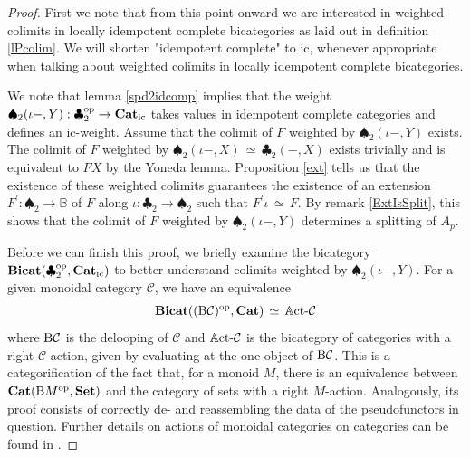 \documentclass[12pt,oneside,reqno,a4paper]{article}
\theoremstyle{definition}
\newcommand{\op}{^\textup{op}}
\newcommand{\Set}{\textbf{\textup{Set}}}
\newcommand{\Cat}{\textbf{\textup{Cat}}}
\newcommand{\Catic}{\textbf{\textup{Cat}}_\textup{ic}}
\newcommand{\Bicat}{\textbf{\textup{Bicat}}}
\newcommand{\rAct}[1]{\mathbb{A}\textup{ct-}#1}
\newcommand{\clb}{\clubsuit}
\newcommand{\spd}{\spadesuit}
\renewcommand{\equiv}{\,\simeq\,}
\newcommand{\B}{\textup{B}}
\newcommand{\C}{\mathcal{C}}
\newcommand{\bB}{\mathbb{B}}
\newcommand{\p}{^\prime}
\begin{document}
\begin{proof}
First we note that from this point onward we are interested in weighted colimits in locally idempotent complete bicategories as laid out in definition \ref{lPcolim}. We will shorten "idempotent complete" to ic, whenever appropriate when talking about weighted colimits in locally idempotent complete bicategories.

We note that lemma \ref{spd2idcomp} implies that the weight $\spd_2(\iota-,Y):\clb_2\op\to\Catic$ takes values in idempotent complete categories and defines an ic-weight. Assume that the colimit of $F$ weighted by $\spd_2(\iota-,Y)$ exists. The colimit of $F$ weighted by $\spd_2(\iota-,X)\equiv \clb_2(-,X)$ exists trivially and is equivalent to $FX$ by the Yoneda lemma. Proposition \ref{ext} tells us that the existence of these weighted colimits guarantees the existence of an extension $F\p:\spd_2\to\bB$ of $F$ along $\iota:\clb_2\to \spd_2$ such that $F\p\iota \equiv F$. By remark \ref{ExtIsSplit}, this shows that the colimit of $F$ weighted by $\spd_2(\iota-,Y)$ determines a splitting of $A_p$.

Before we can finish this proof, we briefly examine the bicategory $\Bicat(\clb_2\op,\Catic)$ to better understand colimits weighted by $\spd_2(\iota-,Y)$. For a given monoidal category $\C$, we have an equivalence
\begin{align*}
\Bicat((\B\C)\op,\Cat)\equiv\rAct{\C}
\end{align*}
where $\B\C$ is the delooping of $\C$ and $\rAct{\C}$ is the bicategory of categories with a right $\C$-action,
given by evaluating at the one object of $\B\C$. This is a categorification of the fact that, for a monoid $M$, there is an equivalence between $\Cat(\B M\op, \Set)$ and the category of sets with a right $M$-action. Analogously, its proof consists of correctly de- and reassembling the data of the pseudofunctors in question. Further details on actions of monoidal categories on categories can be found in \cite{CG}.


\end{proof}
\end{document}
